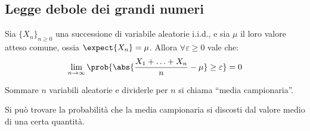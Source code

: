 \subsection{Legge debole dei grandi numeri}

\begin{theorem}
Sia $\{X_n\}_{n \ge 0}$ una successione di variabile aleatorie i.i.d., e sia $\mu$ il loro valore atteso comune, ossia $\expect{X_n} = \mu$. Allora $\forall \varepsilon \ge 0$ vale che:
\[
\lim_{n \to \infty} \prob{\abs{\frac{X_1 + \ldots + X_n}{n} - \mu} \ge \varepsilon} = 0
\]
\end{theorem}
Sommare $n$ variabili aleatorie e dividerle per $n$ si chiama ``media campionaria''.

Si pu\`o trovare la probabilit\`a che la media campionaria si discosti dal valore medio di una certa quantit\`a.


